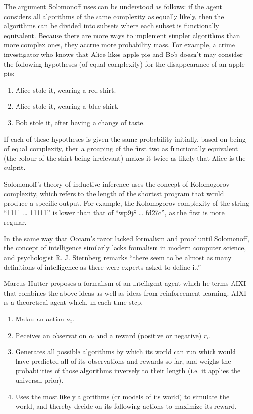 The argument Solomonoff uses can be understood as follows: if the agent considers all algorithms of the same complexity as equally likely, then the algorithms can be divided into subsets where each subset is functionally equivalent. Because there are more ways to implement simpler algorithms than more complex ones, they accrue more probability mass. For example, a crime investigator who knows that Alice likes apple pie and Bob doesn’t may consider the following hypotheses (of equal complexity) for the disappearance of an apple pie:

\begin{enumerate}
    \item Alice stole it, wearing a red shirt.
    \item Alice stole it, wearing a blue shirt.
    \item Bob stole it, after having a change of taste.
\end{enumerate}

If each of these hypotheses is given the same probability initially, based on being of equal complexity, then a grouping of the first two as functionally equivalent (the colour of the shirt being irrelevant) makes it twice as likely that Alice is the culprit.

Solomonoff’s theory of inductive inference uses the concept of Kolomogorov complexity, which refers to the length of the shortest program that would produce a specific output. For example, the Kolomogorov complexity of the string “1111 … 11111” is lower than that of “wp9j8 … fd27c”, as the first is more regular.

In the same way that Occam’s razor lacked formalism and proof until Solomonoff, the concept of intelligence similarly lacks formalism in modern computer science, and psychologist R. J. Sternberg remarks “there seem to be almost as many definitions of intelligence as there were experts asked to define it.” \autocite{Legg2007}

Marcus Hutter \autocite{Hutter2000} proposes a formalism of an intelligent agent which he terms AIXI that combines the above ideas as well as ideas from reinforcement learning. AIXI is a theoretical agent which, in each time step,

\begin{enumerate}
    \item Makes an action $a_i$.
    \item Receives an observation $o_i$ and a reward (positive or negative) $r_i$.
    \item Generates all possible algorithms by which its world can run which would have predicted all of its observations and rewards so far, and weighs the probabilities of those algorithms inversely to their length (i.e. it applies the universal prior).
    \item Uses the most likely algorithms (or models of its world) to simulate the world, and thereby decide on its following actions to maximize its reward.
\end{enumerate}

